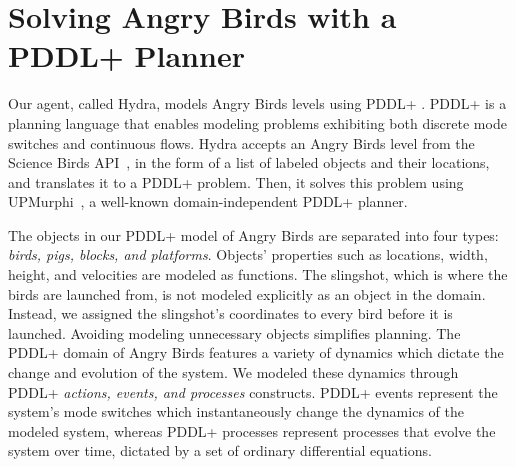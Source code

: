 \documentclass[letterpaper]{article}
\begin{document}
\section{Solving Angry Birds with a PDDL+ Planner}



Our agent, called Hydra, models Angry Birds levels using PDDL+ \cite{fox2006modelling}. PDDL+ is a planning language that enables modeling problems exhibiting both discrete mode switches and continuous flows.
Hydra accepts an Angry Birds level from the Science Birds API~\cite{renz2019ai}, in the form of a list of labeled objects and their locations, and translates it to a PDDL+ problem.
Then, it solves this problem using  UPMurphi~\cite{della2009upmurphi}, a well-known domain-independent PDDL+ planner. %








The objects in our PDDL+ model of Angry Birds are separated into four types: \textit{birds, pigs, blocks, and platforms}.
Objects' properties such as locations, width, height, and velocities are modeled as functions. %
The slingshot, which is where the birds are launched from, is not modeled explicitly as an object in the domain. Instead, we assigned the slingshot's coordinates to every bird before it is launched.
Avoiding modeling unnecessary objects
simplifies planning. %
The PDDL+ domain of Angry Birds features a variety of dynamics which dictate the change and evolution of the system.
We modeled these dynamics through PDDL+ \emph{actions, events, and processes} constructs.
PDDL+ events represent the system's mode switches which instantaneously change the dynamics of the modeled system, whereas PDDL+ processes represent processes that evolve the system over time, dictated by a set of ordinary differential equations.
\end{document}
